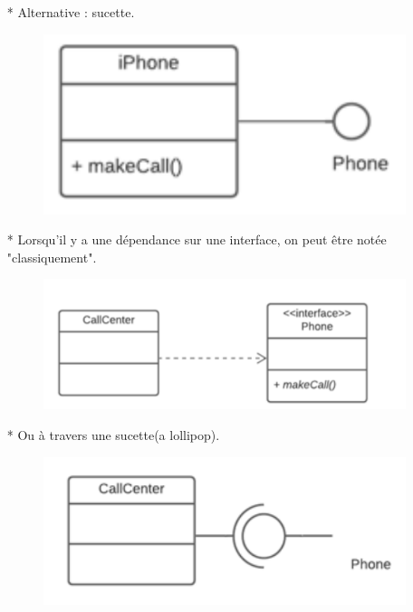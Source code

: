 \documentclass[12pt]{article}
\begin{document}
\begin{itemize}
\begin{figure}[!hbtp]
		\end{figure}
	\item[* ] Alternative : sucette.
	\begin{figure}[!hbtp]
		\centering
		\includegraphics[scale=0.75]{Capture9.PNG}
	\end{figure}
\item[* ] Lorsqu'il y a une dépendance sur une interface, on peut être
notée "classiquement".
\begin{figure}[!hbtp]
	\centering
	\includegraphics[scale=0.75]{Capture10.PNG}
\end{figure}
\item[* ] Ou à travers une sucette(a lollipop).
\begin{figure}[!hbtp]
	\centering
	\includegraphics[scale=0.75]{Capture11.PNG}
\end{figure}
	\end{itemize}
\end{document}
